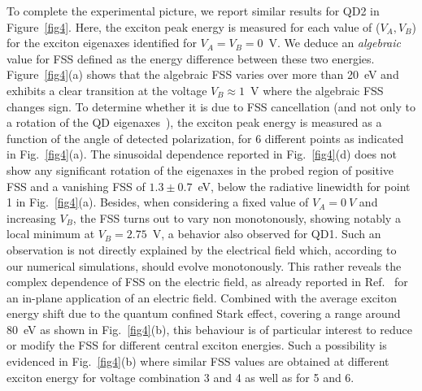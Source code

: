 \documentclass[article,twocolumn, superscriptaddress, 10pt, nofootinbib]{revtex4-1}%
\begin{document}
To complete the experimental picture, we report similar results for QD2 in Figure~\ref{fig4}. {Here,  the exciton peak energy is measured for each value of ($V_A,V_B$) for  the exciton eigenaxes identified for $V_A=V_B=0$~V. We deduce an \emph{algebraic} value for FSS defined as the energy difference between these two energies. } Figure~\ref{fig4}(a) shows that the  algebraic FSS  varies over more than 20~\textmu eV and exhibits a clear  transition  at the voltage  $V_B\approx 1$~V where the algebraic FSS changes sign. To  determine whether it is due to FSS cancellation (and not only to a rotation of the QD eigenaxes~\cite{bennett2012,TrottaUniversalRecovery}), the exciton peak energy is measured as a function of the angle of detected polarization, for 6 different  points as indicated in Fig.~\ref{fig4}(a). The sinusoidal dependence  reported in Fig.~\ref{fig4}(d) does not show any significant rotation of the eigenaxes in the probed region of positive FSS and a vanishing FSS of $ 1.3\pm 0.7$~\textmu eV, below the radiative linewidth for point 1 in Fig.~\ref{fig4}(a). Besides, when considering a fixed value of $V_A=0\  V$ and increasing $V_B$, the FSS turns out to vary non  monotonously, showing  notably  a local minimum at $V_B=2.75$~V, a  behavior also observed  for QD1. Such an observation is not directly explained by the electrical field which, according to our numerical simulations, should evolve monotonously. This rather reveals the complex dependence of  FSS on the electric field, as already reported in Ref.~ for an in-plane application of an electric field. Combined with the average exciton energy shift due to the quantum confined Stark effect, covering a range around 80~\textmu eV as shown in Fig.~\ref{fig4}(b), this behaviour is of particular interest to reduce or modify  the FSS for different central exciton energies. Such a possibility is evidenced in Fig.~\ref{fig4}(b) where similar FSS values are obtained at different exciton energy {for voltage combination} 3 and 4 as well as for 5 and 6.


\end{document}
